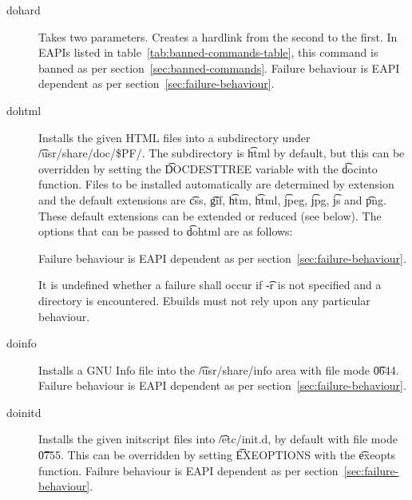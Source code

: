 \begin{description}
\item[dohard] Takes two parameters. Creates a hardlink from the second to the first. In EAPIs
    listed in table~\ref{tab:banned-commands-table}, this command is banned as per
    section~\ref{sec:banned-commands}. Failure behaviour is EAPI dependent as per
    section~\ref{sec:failure-behaviour}.

\item[dohtml] Installs the given HTML files into a subdirectory under \t{/usr/share/doc/\$PF/}.
The subdirectory is \t{html} by default, but this can be overridden by setting the \t{DOCDESTTREE}
variable with the \t{docinto} function. Files to be installed automatically are determined by
extension and the default extensions are \t{css}, \t{gif}, \t{htm}, \t{html}, \t{jpeg}, \t{jpg},
\t{js} and \t{png}. These default extensions can be extended or reduced (see below). The options
that can be passed to \t{dohtml} are as follows:

    Failure behaviour is EAPI dependent as per section~\ref{sec:failure-behaviour}.

    It is undefined whether a failure shall occur if \t{-r} is not specified and a directory is
    encountered. Ebuilds must not rely upon any particular behaviour.

\item[doinfo] Installs a GNU Info file into the \t{/usr/share/info} area with file mode \t{0644}.
    Failure behaviour is EAPI dependent as per section~\ref{sec:failure-behaviour}.

\item[doinitd] Installs the given initscript files into \t{/etc/init.d}, by default with file mode
    \t{0755}. This can be overridden by setting \t{EXEOPTIONS} with the \t{exeopts} function.
    Failure behaviour is EAPI dependent as per section~\ref{sec:failure-behaviour}.


\end{description}
